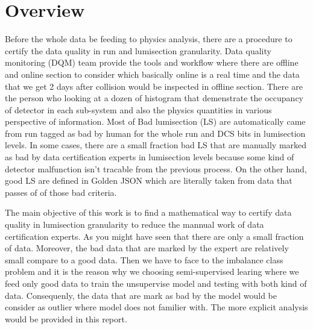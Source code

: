 \chapter{Overview}

Before the whole data be feeding to physics analysis, there are a procedure to certify the data quality in run and lumisection granularity.
Data quality monitoring (DQM) team provide the tools and workflow where there are offline and online section to consider which basically online is a real time and the data that we get 2 days after collision would be inspected in offline section.
There are the person who looking at a dozen of histogram that demenstrate the occupancy of detector in each sub-system and also the physics quantities in various perspective of information.
Most of Bad lumisection (LS) are automatically came from run tagged as bad by human for the whole run and DCS bits in lumisection levels. In some cases, there are a small fraction bad LS that are manually marked as bad by data certification experts in lumisection levels because some kind of detector malfunction isn't tracable from the previous process.
On the other hand, good LS are defined in Golden JSON which are literally taken from data that passes of of those bad criteria.

The main objective of this work is to find a mathematical way to certify data quality in lumisection granularity to reduce the mannual work of data certification experts.
As you might have seen that there are only a small fraction of data. Moreover, the bad data that are marked by the expert are relatively small compare to a good data.
Then we have to face to the imbalance class problem and it is the reason why we choosing semi-supervised learing where we feed only good data to train the unsupervise model and testing with both kind of data.
Consequenly, the data that are mark as bad by the model would be consider as outlier where model does not familier with. The more explicit analysis would be provided in this report.